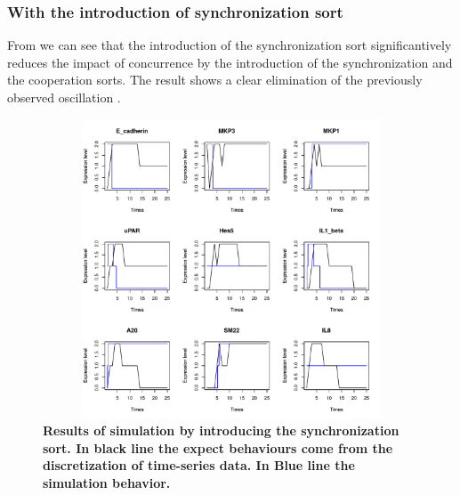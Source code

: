 \subsubsection{With the introduction of synchronization sort}

From  we can see that the introduction of the synchronization sort significantively reduces the 
impact of concurrence by the introduction of the synchronization and the cooperation sorts. The result shows  a 
clear elimination of the previously observed oscillation . 


\begin{figure}[!t]
\centering
\includegraphics[width=6.5in,height=3.5in]{images/resultWS.pdf}
\caption{\bf Results of simulation by introducing the synchronization sort. In black line the expect behaviours
come from the discretization of time-series data. In Blue line the simulation behavior.}
\label{fig:rws}
\end{figure}



%
%

